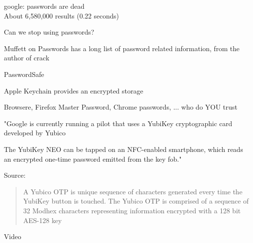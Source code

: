 \documentclass[20pt,landscape,a4paper,footrule]{foils}
\begin{document}

google: passwords are dead\\
About 6,580,000 results (0.22 seconds)


Can we stop using passwords?

Muffett on Passwords has a long list of password related information, from the author of crack 





\begin{list1}
\item PasswordSafe 
\item Apple Keychain provides an encrypted storage
\item Browsere, Firefox Master Password, Chrome passwords, ... who do YOU trust
\end{list1}




"Google is currently running a pilot that uses a YubiKey cryptographic card developed by Yubico

The YubiKey NEO can be tapped on an NFC-enabled smartphone, which reads an encrypted one-time password emitted from the key fob."

{\footnotesize Source:
}


\begin{quote}
A Yubico OTP is unique sequence of characters generated every time the YubiKey button is touched. The Yubico OTP is comprised of a sequence of 32 Modhex characters representing information encrypted with a 128 bit AES-128 key
\end{quote}



Video
\end{document}
